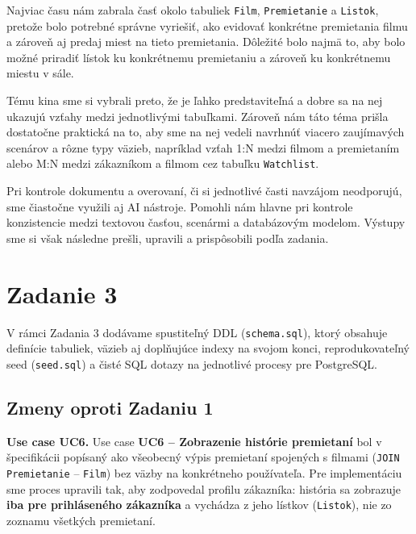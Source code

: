 \documentclass[11pt, a4paper]{article}
\begin{document}
Najviac času nám zabrala časť okolo tabuliek \texttt{Film}, \texttt{Premietanie} a \texttt{Listok},
pretože bolo potrebné správne vyriešiť, ako evidovať konkrétne premietania filmu a zároveň aj
predaj miest na tieto premietania. Dôležité bolo najmä to, aby bolo možné priradiť lístok ku
konkrétnemu premietaniu a zároveň ku konkrétnemu miestu v sále.

Tému kina sme si vybrali preto, že je ľahko predstaviteľná a dobre sa na nej ukazujú vzťahy medzi
jednotlivými tabuľkami. Zároveň nám táto téma prišla dostatočne praktická na to, aby sme na nej
vedeli navrhnúť viacero zaujímavých scenárov a rôzne typy väzieb, napríklad vzťah 1:N medzi
filmom a premietaním alebo M:N medzi zákazníkom a filmom cez tabuľku \texttt{Watchlist}.

Pri kontrole dokumentu a overovaní, či si jednotlivé časti navzájom neodporujú, sme čiastočne
využili aj AI nástroje. Pomohli nám hlavne pri kontrole konzistencie medzi textovou časťou,
scenármi a databázovým modelom. Výstupy sme si však následne prešli, upravili a prispôsobili
podľa zadania.

\section{Zadanie 3}
\label{sec:zadanie3}

V rámci Zadania 3 dodávame spustiteľný DDL (\texttt{schema.sql}), ktorý obsahuje definície tabuliek, väzieb aj doplňujúce indexy na svojom konci, reprodukovateľný seed (\texttt{seed.sql}) a čisté SQL dotazy na jednotlivé procesy pre PostgreSQL.

\subsection{Zmeny oproti Zadaniu 1}

\textbf{Use case UC6.}
Use case \textbf{UC6 -- Zobrazenie histórie premietaní} bol v špecifikácii popísaný ako všeobecný výpis premietaní spojených s filmami (\texttt{JOIN} \texttt{Premietanie} -- \texttt{Film}) bez väzby na konkrétneho používateľa.
Pre implementáciu sme proces upravili tak, aby zodpovedal profilu zákazníka: história sa zobrazuje \textbf{iba pre prihláseného zákazníka} a vychádza z jeho lístkov (\texttt{Listok}), nie zo zoznamu všetkých premietaní.
\end{document}
